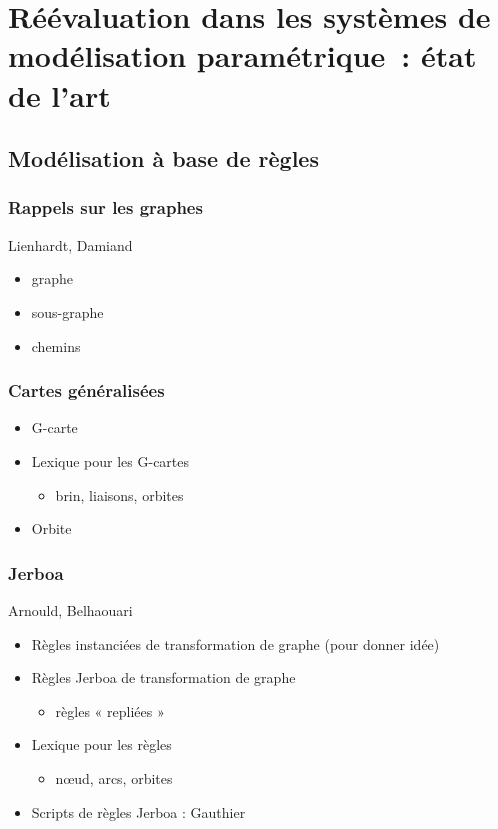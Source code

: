 \chapter[Réévaluation dans les systèmes de modélisation paramétrique~: état
  de l'art]{Réévaluation dans les systèmes de modélisation paramétrique~: état
  de l'art}
\label{cha:etat-art-reevaluation}

\section[Modélisation à base de règles]{Modélisation à base de règles}
\label{sec:etat-art-model-regles}

\subsection[Rappels sur les graphes]{Rappels sur les graphes}
\label{sec:etat-art-rappels-graphes}

Lienhardt, Damiand
\begin{itemize}
	\item graphe
	\item sous-graphe
	\item chemins
\end{itemize}

\subsection[Cartes généralisées]{Cartes généralisées}
\label{sec:etat-art-cartes-generalisees}
\begin{itemize}
	\item G-carte
	\item Lexique pour les G-cartes
	      \begin{itemize}
		      \item brin, liaisons, orbites
	      \end{itemize}
	\item Orbite
\end{itemize}

\subsection[Jerboa]{Jerboa}
\label{sec:etat-art-jerboa}

Arnould, Belhaouari
\begin{itemize}
	\item Règles instanciées de transformation de graphe (pour donner idée)
	\item Règles Jerboa de transformation de graphe
	      \begin{itemize}
		      \item règles « repliées »
	      \end{itemize}
	\item Lexique pour les règles
	      \begin{itemize}
		      \item nœud, arcs, orbites
	      \end{itemize}
	\item Scripts de règles Jerboa : Gauthier
\end{itemize}

